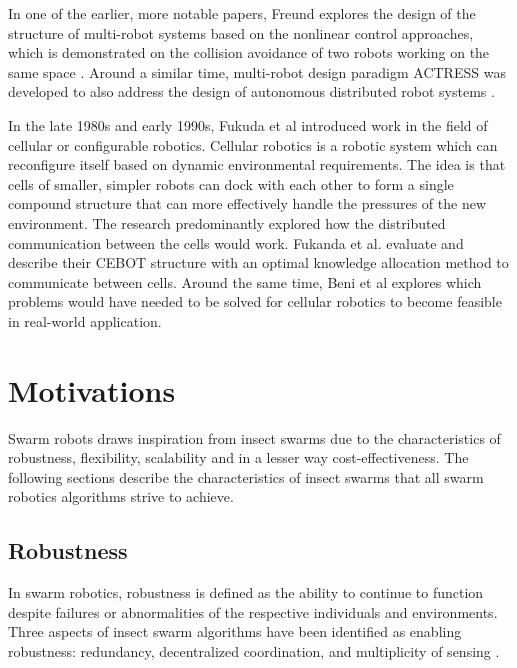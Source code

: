 In one of the earlier, more notable papers, Freund explores the design of the structure of multi-robot systems based on the nonlinear control approaches, which is demonstrated on the collision avoidance of two robots working on the same space \cite{freund1984design,freund1986pathfinding}.
Around a similar time, multi-robot design paradigm ACTRESS was developed to also address the design of autonomous distributed robot systems \cite{asama1989design}. 

In the late 1980s and early 1990s, Fukuda et al \cite{fukuda1989communication,fukuda1990analysis} introduced work in the field of cellular or configurable robotics. Cellular robotics is a robotic system which can reconfigure itself based on dynamic environmental requirements. The idea is that cells of smaller, simpler robots can dock with each other to form a single compound structure that can more effectively handle the pressures of the new environment. The research predominantly explored how the distributed communication between the cells would work. Fukanda et al. evaluate and describe their CEBOT structure with an optimal knowledge allocation method to communicate between cells. 
Around the same time, Beni et al \cite{beni1991theoretical} explores which problems would have needed to be solved for cellular robotics to become feasible in real-world application.


\section{Motivations}
\label{sec:first:advantages}

Swarm robots draws inspiration from insect swarms due to the characteristics of robustness, flexibility, scalability and in a lesser way cost-effectiveness. The following sections describe the characteristics of insect swarms that all swarm robotics algorithms strive to achieve. 

\subsection{Robustness}
\label{robustness}

In swarm robotics, robustness is defined as the ability to continue to function despite failures or abnormalities of the respective individuals and environments. Three aspects of insect swarm algorithms have been identified as enabling robustness: redundancy, decentralized coordination, and multiplicity of sensing \cite{csahin2005swarm}.

